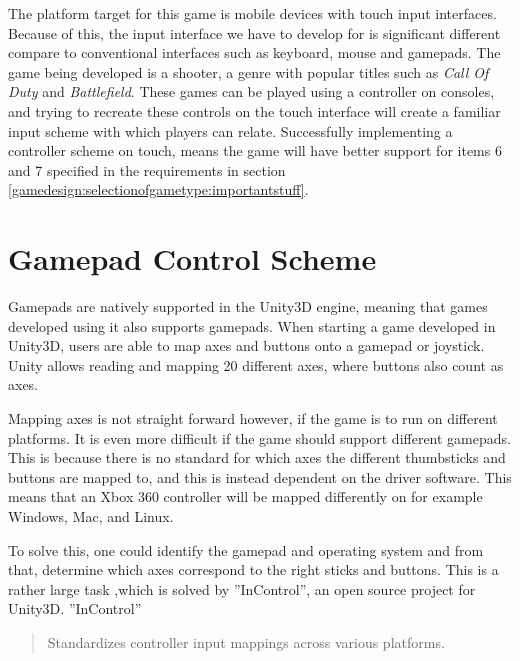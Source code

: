 The platform target for this game is mobile devices with touch input interfaces.
Because of this, the input interface we have to develop for is significant different compare to conventional interfaces such as keyboard, mouse and gamepads.
The game being developed is a shooter, a genre with popular titles such as \textit{Call Of Duty}\cite{callofdutysales} and \textit{Battlefield}\cite{battlefieldsales}.
These games can be played using a controller on consoles, and trying to recreate these controls on the touch interface will create a familiar input scheme with which players can relate.
Successfully implementing a controller scheme on touch, means the game will have better support for items 6 and 7 specified in the requirements in section \ref{gamedesign:selectionofgametype:importantstuff}.

\section{Gamepad Control Scheme}
Gamepads are natively supported in the Unity3D engine, meaning that games developed using it also supports gamepads\cite{unity_manual_inputmanager}.
When starting a game developed in Unity3D, users are able to map axes and buttons onto a gamepad or joystick. Unity allows reading and mapping 20 different axes, where buttons also count as axes.

Mapping axes is not straight forward however, if the game is to run on different platforms.
It is even more difficult if the game should support different gamepads.
This is because there is no standard for which axes the different thumbsticks and buttons are mapped to, and this is instead dependent on the driver software.
This means that an Xbox 360 controller will be mapped differently on for example Windows, Mac, and Linux.
\cite{unity_wiki_xbox360controller}

To solve this, one could identify the gamepad and operating system and from that, determine which axes correspond to the right sticks and buttons. This is a rather large task ,which is solved by ''InControl'', an open source project for Unity3D\cite{incontrol_github}. ''InControl'' \begin{quote}Standardizes controller input mappings across various platforms.\cite{incontrol_website}\end{quote}

